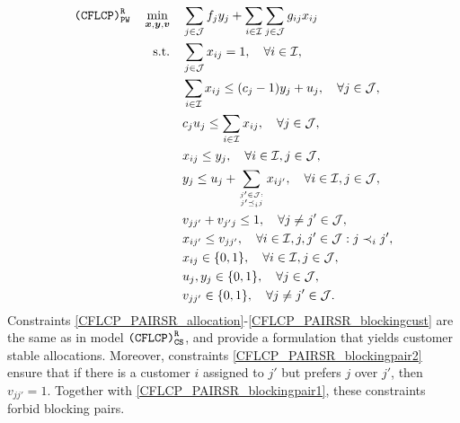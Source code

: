 \documentclass[preprint,11pt,authoryear]{elsarticle}
\def\J{\mathcal{J}}
\def\I{\mathcal{I}}
\begin{document}
\begin{subequations} \label{CFLCP_PAIRSR}
\begin{align}
\texttt{(CFLCP)}_{\texttt{PW}}^\texttt{R} \quad \min_{\boldsymbol{x},\boldsymbol{y},\boldsymbol{v}} \quad & \sum_{j\in \J} f_jy_j + \sum_{i\in \I} \sum_{j\in \J} g_{ij}x_{ij}  \label{CFLCP_PAIRSR_FO} \\
\text{s.t.} \quad &\sum_{j\in \J} x_{ij} = 1, \quad \forall i\in \I, \label{CFLCP_PAIRSR_allocation}\\
& \sum_{i\in \I} x_{ij}  \le (c_j-1)y_j+u_j, \quad \forall j\in\J, \label{CFLCP_PAIRSR_capacity1}\\
& c_ju_j \le \sum_{i\in \I} x_{ij}, \quad \forall j\in\J, \label{CFLCP_PAIRSR_capacity0}\\
&x_{ij} \le y_j, \quad \forall i \in \I, j \in \J, \label{CFLCP_PAIRSR_allocationOpenPlants} \\
&  y_j \le u_j + \sum_{j'\in \J:\atop j'\preceq_i j} x_{ij'}, \quad \forall i\in \I, j\in \J, \label{CFLCP_PAIRSR_blockingcust} \\
&  v_{jj'} + v_{j'j} \leq 1, \quad \forall j\neq j'\in \J, \label{CFLCP_PAIRSR_blockingpair1} \\
&  x_{ij'} \le v_{jj'}, \quad \forall i\in \I, j,j'\in \J: j \prec_i j', \label{CFLCP_PAIRSR_blockingpair2} \\
& x_{ij} \in \{0,1\}, \quad \forall i \in \I, j \in \J,  \label{CFLCP_PAIRSR_xbinarias} \\
& u_j, y_j \in \{0,1\}, \quad \forall j \in \J,  \label{CFLCP_PAIRSR_ybinarias} \\
& v_{jj'} \in \{0,1\}, \quad \forall j\neq j' \in \J.  \label{CFLCP_PAIRSR_vbinarias} 
\end{align}
\end{subequations}
Constraints \eqref{CFLCP_PAIRSR_allocation}-\eqref{CFLCP_PAIRSR_blockingcust} are the same as in model ${\normalfont\texttt{(CFLCP)}_{\texttt{CS}}^\texttt{R}}$, and provide a formulation that yields customer stable allocations. Moreover, constraints \eqref{CFLCP_PAIRSR_blockingpair2} ensure that if there is a customer $i$ assigned to $j'$ but prefers $j$ over $j'$, then $v_{jj'}=1$. Together with \eqref{CFLCP_PAIRSR_blockingpair1}, these constraints forbid blocking pairs.
\end{document}
